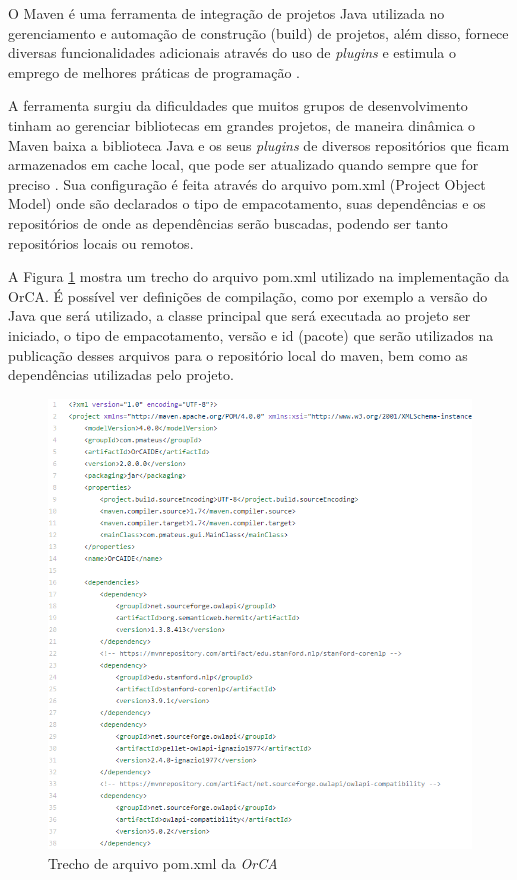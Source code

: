 \documentclass{bcc}
\begin{document}
O Maven é uma ferramenta de integração de projetos Java utilizada no gerenciamento e automação de construção (build) de projetos, além disso, fornece diversas funcionalidades adicionais através do uso de \textit{plugins} e estimula o emprego de melhores práticas de programação \cite{maven}.

A ferramenta surgiu da dificuldades que muitos grupos de desenvolvimento tinham ao gerenciar bibliotecas em grandes projetos, de maneira dinâmica o Maven baixa a biblioteca Java e os seus \textit{plugins} de diversos repositórios que ficam armazenados em cache local, que pode ser atualizado quando sempre que for preciso \cite{oliveira2016}. Sua configuração é feita através do arquivo pom.xml (Project Object Model) onde são declarados o tipo de empacotamento, suas dependências e os repositórios de onde as dependências serão buscadas, podendo ser tanto repositórios locais ou remotos. \cite{junior2014}

A Figura \ref{fig:pom_xml} mostra um trecho do arquivo pom.xml utilizado na implementação da OrCA. É possível ver definições de compilação, como por exemplo a versão do Java que será utilizado, a classe principal que será executada ao projeto ser iniciado, o tipo de empacotamento, versão e id (pacote) que serão utilizados na publicação desses arquivos para o repositório local do maven, bem como as dependências utilizadas pelo projeto.

\begin{figure}[H]
\centering
\includegraphics[width=1\textwidth]{Figuras/pom_xml.png}
\caption{Trecho de arquivo pom.xml da \textit{OrCA}}
\label{fig:pom_xml}
\end{figure}
\end{document}
